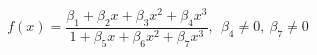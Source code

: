 

\[
f(x) = \frac{\beta_1 + \beta_2x + \beta_3x^2 + \beta_4x^3}{1 + \beta_5x + \beta_6x^2 + \beta_7x^3}, \ \ \beta_4 \neq 0, \ \beta_7 \neq 0
\]


